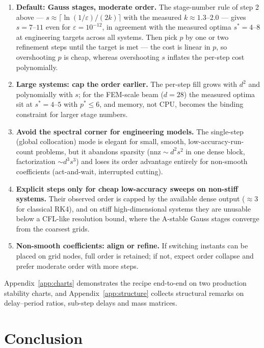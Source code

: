 \documentclass[Afour,sageh,times]{sagej}
\begin{document}
\begin{enumerate}
  \item \textbf{Default: Gauss stages, moderate order.} The stage-number
        rule of step 2 above --- $s \approx \lceil\ln(1/\varepsilon)/(2k)\rceil$
        with the measured $k \approx 1.3$--$2.0$ --- gives $s = 7$--$11$ even
        for $\varepsilon = 10^{-12}$, in agreement with the measured optima
        $s^\ast = 4$--$8$ at engineering targets across all systems. Then pick
        $p$ by one or two refinement steps until the target is met --- the
        cost is linear in $p$, so overshooting $p$ is cheap, whereas
        overshooting $s$ inflates the per-step cost polynomially.
  \item \textbf{Large systems: cap the order earlier.} The per-step fill
        grows with $d^2$ and polynomially with $s$; for the FEM-scale beam
        ($d = 28$) the measured optima sit at $s^\ast = 4$--$5$ with
        $p^\ast \le 6$, and memory, not CPU, becomes the binding constraint
        for larger stage numbers.
  \item \textbf{Avoid the spectral corner for engineering models.} The
        single-step (global collocation) mode is elegant for small, smooth,
        low-accuracy-run-count problems, but it abandons sparsity
        ($\mathrm{nnz} \sim d^2 s^2$ in one dense block, factorization
        $\sim d^3 s^3$) and loses its order
        advantage entirely for non-smooth coefficients (act-and-wait,
        interrupted cutting).
  \item \textbf{Explicit steps only for cheap low-accuracy sweeps on
        non-stiff systems.} Their observed order is capped by the available
        dense output ($\approx 3$ for classical RK4), and on stiff
        high-dimensional systems they are unusable below a CFL-like
        resolution bound, where the A-stable Gauss stages converge from the
        coarsest grids.
  \item \textbf{Non-smooth coefficients: align or refine.} If switching
        instants can be placed on grid nodes, full order is retained; if
        not, expect order collapse and prefer moderate order with more
        steps.
\end{enumerate}
Appendix~\ref{app:charts} demonstrates the recipe end-to-end on two
production stability charts, and Appendix~\ref{app:structure} collects
structural remarks on delay--period ratios, sub-step delays and mass
matrices.

\section{Conclusion}
\label{sec:conclusion}
\end{document}
